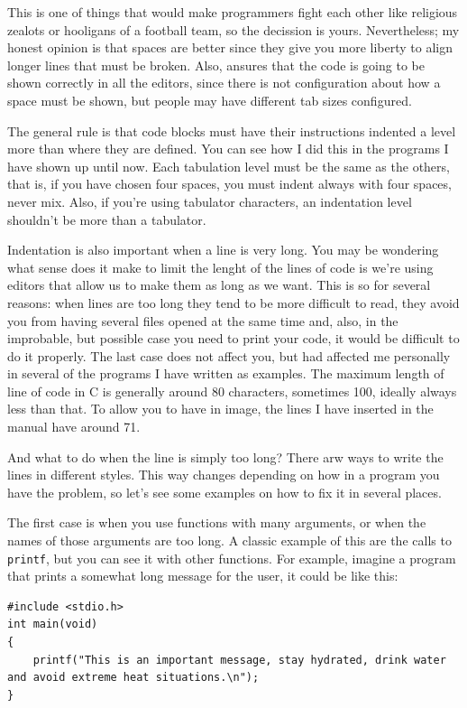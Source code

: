 \documentclass[a4paper]{article}
\begin{document}
This is one of things that would make programmers fight each other like
religious zealots or hooligans of a football team, so the decission is yours.
Nevertheless; my honest opinion is that spaces are better since they give you
more liberty to align longer lines that must be broken. Also, ansures that the
code is going to be shown correctly in all the editors, since there is not
configuration about how a space must be shown, but people may have different tab
sizes configured.

The general rule is that code blocks must have their instructions indented a
level more than where they are defined. You can see how I did this in the
programs I have shown up until now. Each tabulation level must be the same as
the others, that is, if you have chosen four spaces, you must indent always with
four spaces, never mix. Also, if you're using tabulator characters, an
indentation level shouldn't be more than a tabulator.

Indentation is also important when a line is very long. You may be wondering
what sense does it make to limit the lenght of the lines of code is we're using
editors that allow us to make them as long as we want. This is so for several
reasons: when lines are too long they tend to be more difficult to read, they
avoid you from having several files opened at the same time and, also, in the
improbable, but possible case you need to print your code, it would be difficult
to do it properly. The last case does not affect you, but had affected me
personally in several of the programs I have written as examples. The maximum
length of line of code in C is generally around 80 characters, sometimes 100,
ideally always less than that. To allow you to have in image, the lines
I have inserted in the manual have around 71.

And what to do when the line is simply too long? There arw ways to write the
lines in different styles. This way changes depending on how in a program you
have the problem, so let's see some examples on how to fix it in several places.

The first case is when you use functions with many arguments, or when the names
of those arguments are too long. A classic example of this are the calls to
\verb!printf!, but you can see it with other functions. For example, imagine
a program that prints a somewhat long message for the user, it could be like
this:

\noindent
\begin{minipage}[H]{\linewidth}
\mbox{}
\begin{lstlisting}[style=C,
caption={Long printing instruction},
label={lst:longprint}]
#include <stdio.h>
int main(void)
{
    printf("This is an important message, stay hydrated, drink water and avoid extreme heat situations.\n");
}

\end{lstlisting}
\end{minipage}
\end{document}
